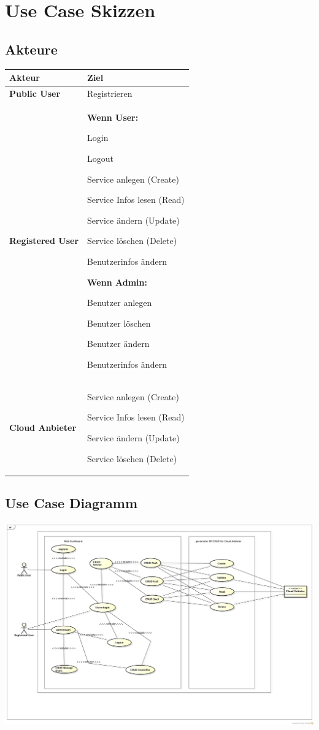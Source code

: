 \newpage
\section{Use Case Skizzen}
\subsection{Akteure}
\begin{tabularx}{\linewidth}{X X}
\textbf{Akteur} & \textbf{Ziel}\\
\hline
\textbf{Public User} &
Registrieren
\\
\hline
\textbf{Registered User} & 
\textbf{Wenn User:}

Login

Logout

Service anlegen (Create)

Service Infos lesen (Read)

Service ändern (Update)

Service löschen (Delete)

Benutzerinfos ändern

\textbf{Wenn Admin:}

Benutzer anlegen

Benutzer löschen

Benutzer ändern

Benutzerinfos ändern

\\
\hline
\textbf{Cloud Anbieter} &
Service anlegen (Create)

Service Infos lesen (Read)

Service ändern (Update)

Service löschen (Delete)
\\

\end{tabularx}


\subsection{Use Case Diagramm}

\includegraphics[width=\textwidth]{./03_Analyse/04_UseCases/images/UseCase-Skizzen}


